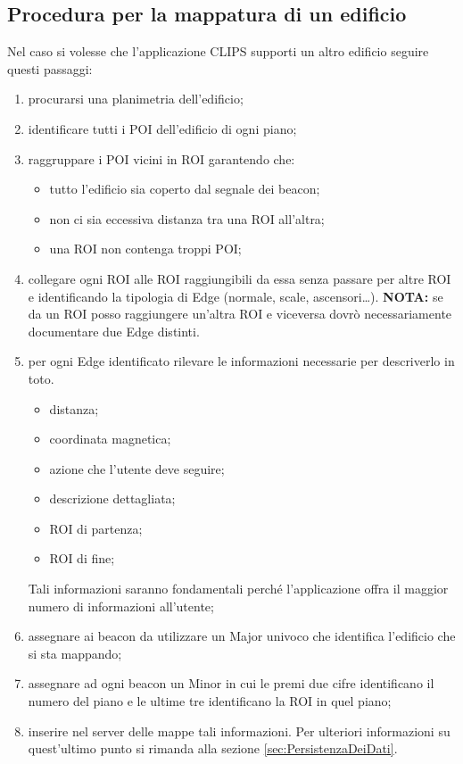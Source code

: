 \documentclass[../ManualeSviluppatore.tex]{subfiles}
\begin{document}
	\subsection{Procedura per la mappatura di un edificio}
		Nel caso si volesse che l'applicazione CLIPS supporti un altro edificio seguire questi passaggi:
		\begin{enumerate}
			\item procurarsi una planimetria dell'edificio;
			\item identificare tutti i POI dell'edificio di ogni piano;
			\item raggruppare i POI vicini in ROI garantendo che:
			\begin{itemize}
				\item tutto l'edificio sia coperto dal segnale dei beacon;
				\item non ci sia eccessiva distanza tra una ROI all'altra;
				\item una ROI non contenga troppi POI;
			\end{itemize}
			\item collegare ogni ROI alle ROI raggiungibili da essa senza passare per altre ROI e identificando la tipologia di Edge (normale, scale, ascensori\dots). \textbf{NOTA:} se da un ROI posso raggiungere un'altra ROI e viceversa dovrò necessariamente documentare due Edge distinti.
			\item per ogni Edge identificato rilevare le informazioni necessarie per descriverlo in toto. 
			\begin{itemize}
				\item distanza;
				\item coordinata magnetica;
				\item azione che l'utente deve seguire;
				\item descrizione dettagliata;
				\item ROI di partenza;
				\item ROI di fine;
			\end{itemize}
			Tali informazioni saranno fondamentali perché l'applicazione offra il maggior numero di informazioni all'utente;
			\item assegnare ai beacon da utilizzare un Major univoco che identifica l'edificio che si sta mappando;
			\item assegnare ad ogni beacon un Minor in cui le premi due cifre identificano il numero del piano e le ultime tre identificano la ROI in quel piano;
			\item inserire nel server delle mappe tali informazioni. Per ulteriori informazioni su quest'ultimo punto si rimanda alla sezione \ref{sec:PersistenzaDeiDati}.
		\end{enumerate}
\end{document}
